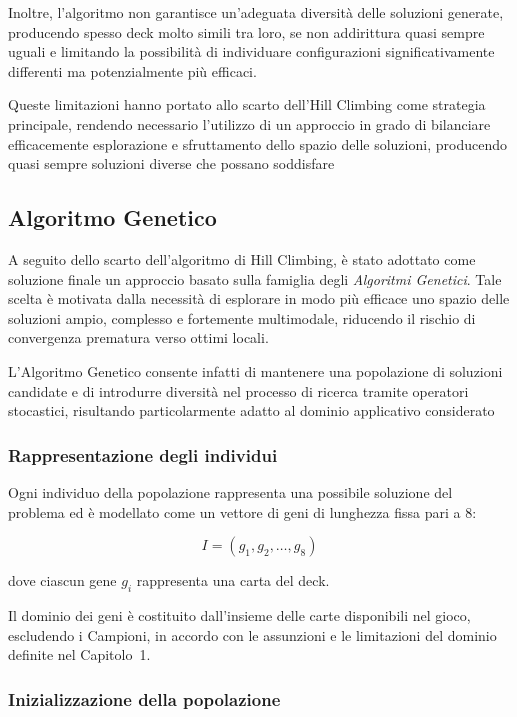 \documentclass{article}
\begin{document}
Inoltre, l’algoritmo non garantisce un’adeguata diversità delle soluzioni generate, producendo spesso deck molto simili tra loro, se non addirittura quasi sempre uguali e limitando la possibilità di individuare configurazioni significativamente differenti ma potenzialmente più efficaci.

Queste limitazioni hanno portato allo scarto dell’Hill Climbing come strategia principale, rendendo necessario l’utilizzo di un approccio in grado di bilanciare efficacemente esplorazione e sfruttamento dello spazio delle soluzioni, producendo quasi sempre soluzioni diverse che possano soddisfare 

\subsection{Algoritmo Genetico}

A seguito dello scarto dell’algoritmo di Hill Climbing, è stato adottato come soluzione finale un approccio basato sulla famiglia degli \textit{Algoritmi Genetici}. 
Tale scelta è motivata dalla necessità di esplorare in modo più efficace uno spazio delle soluzioni ampio, complesso e fortemente multimodale, riducendo il rischio di convergenza prematura verso ottimi locali.

L’Algoritmo Genetico consente infatti di mantenere una popolazione di soluzioni candidate e di introdurre diversità nel processo di ricerca tramite operatori stocastici, risultando particolarmente adatto al dominio applicativo considerato

\subsubsection{Rappresentazione degli individui}

Ogni individuo della popolazione rappresenta una possibile soluzione del problema ed è modellato come un vettore di geni di lunghezza fissa pari a 8:

\[
I = (g_1, g_2, \dots, g_8)
\]

dove ciascun gene $g_i$ rappresenta una carta del deck.

Il dominio dei geni è costituito dall’insieme delle carte disponibili nel gioco, escludendo i Campioni, in accordo con le assunzioni e le limitazioni del dominio definite nel Capitolo~1.

\subsubsection{Inizializzazione della popolazione}
\end{document}
